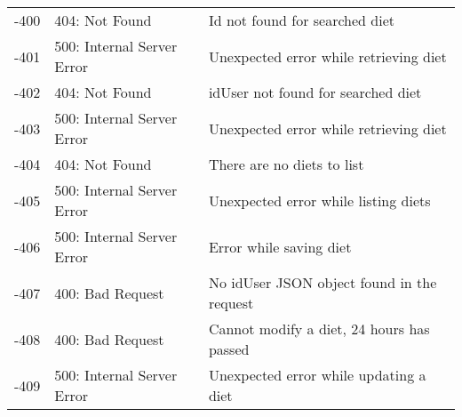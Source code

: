 \begin{longtable}{ | c | l | p{} | }
-400 & 404: Not Found & Id not found for searched diet\\
-401 & 500: Internal Server Error & Unexpected error while retrieving diet\\
-402 & 404: Not Found & idUser not found for searched diet\\
-403 & 500: Internal Server Error & Unexpected error while retrieving diet\\
-404 & 404: Not Found & There are no diets to list\\
-405 & 500: Internal Server Error & Unexpected error while listing diets\\
-406 & 500: Internal Server Error & Error while saving diet\\
-407 & 400: Bad Request & No idUser JSON object found in the request\\
-408 & 400: Bad Request & Cannot modify a diet, 24 hours has passed\\
-409 & 500: Internal Server Error & Unexpected error while updating a diet  \\\hline


\end{longtable}
